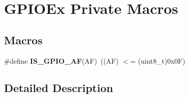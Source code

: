 \hypertarget{group___g_p_i_o_ex___private___macros}{\section{G\-P\-I\-O\-Ex Private Macros}
\label{group___g_p_i_o_ex___private___macros}
}
\subsection*{Macros}
\begin{DoxyCompactItemize}
\item 
\hypertarget{group___g_p_i_o_ex___private___macros_ga79eead44ddc05f1aa13d93c69196bced}{\#define {\bfseries I\-S\-\_\-\-G\-P\-I\-O\-\_\-\-A\-F}(A\-F)~((A\-F) $<$= (uint8\-\_\-t)0x0\-F)}\label{group___g_p_i_o_ex___private___macros_ga79eead44ddc05f1aa13d93c69196bced}

\end{DoxyCompactItemize}


\subsection{Detailed Description}
